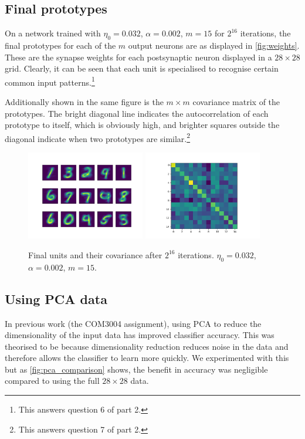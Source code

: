 \documentclass[a4paper, 11pt, twocolumn, final]{article} %
\begin{document}
\subsection{Final prototypes} On a network trained with $\eta_0 = 0.032$,
$\alpha = 0.002$, $m = 15$ for $2^{16}$ iterations, the final prototypes for
each of the $m$ output neurons are as displayed in \autoref{fig:weights}.  These
are the synapse weights for each postsynaptic neuron displayed in a $28\times28$
grid. Clearly, it can be seen that each unit is specialised to recognise certain
common input patterns.\footnote{This answers question 6 of part 2.}

Additionally shown in the same figure is the $m\times{}m$ covariance matrix of
the prototypes. The bright diagonal line indicates the autocorrelation of each
prototype to itself, which is obviously high, and brighter squares outside the
diagonal indicate when two prototypes are similar.\footnote{This answers
question 7 of part 2.}

\begin{figure}
  \includegraphics[width=0.46\textwidth]{weights.png}
  \includegraphics[width=0.46\textwidth]{unit_covariance.png}
  \caption{Final units and their covariance after $2^{16}$ iterations.
           $\eta_0 = 0.032$, $\alpha = 0.002$, $m = 15$.}
  \label{fig:weights}
\end{figure}

\subsection{Using PCA data} In previous work (the COM3004 assignment), using PCA
to reduce the dimensionality of the input data has improved classifier accuracy.
This was theorised to be because dimensionality reduction reduces noise in the
data and therefore allows the classifier to learn more quickly.  We experimented
with this but as \autoref{fig:pca_comparison} shows, the benefit in accuracy was
negligible compared to using the full $28\times28$ data.
\end{document}
